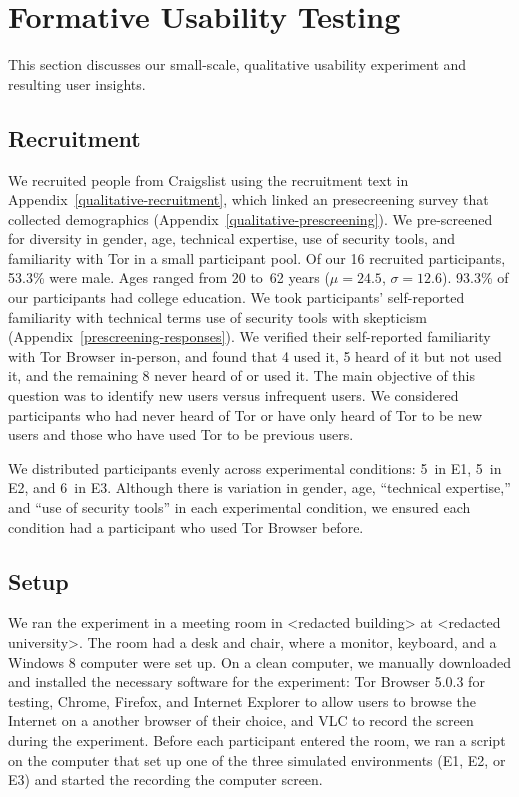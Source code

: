 \documentclass[USenglish,oneside,twocolumn]{article}
\begin{document}
\section{Formative Usability Testing}
\label{sec:qualitative}
This section discusses our small-scale, qualitative usability experiment and resulting user insights. 

\subsection{Recruitment}
We recruited people from Craigslist using the recruitment text in Appendix~\ref{qualitative-recruitment}, which linked an presecreening survey that collected demographics (Appendix~\ref{qualitative-prescreening}). We pre-screened~\cite{screening} for diversity in gender, age, technical expertise, use of security tools, and familiarity with Tor in a small participant pool. {\color {red} Of our 16 recruited participants, 53.3\% were male. Ages ranged from 20 to~62 years ($\mu = 24.5$, $\sigma = 12.6$). 93.3\% of our participants had college education.} We took participants' self-reported familiarity with technical terms use of security tools with skepticism (Appendix~\ref{prescreening-responses}). We verified their self-reported familiarity with Tor Browser in-person, and found that 4 used it, 5 heard of it but not used it, and the remaining 8 never heard of or used it. The main objective of this question was to identify new users versus infrequent users. We considered participants who had never heard of Tor or have only heard of Tor to be new users and those who have used Tor to be previous users. 

We distributed participants evenly across experimental conditions:  5~in E1, 5~in E2, and 6~in E3. Although there is variation in gender, age, ``technical expertise,'' and ``use of security tools'' in each experimental condition, we ensured each condition had a participant who used Tor Browser before. 

\subsection{Setup} 
We ran the experiment in a meeting room in <redacted building> at <redacted university>. The room had a desk and chair, where a monitor, keyboard, and a Windows 8 computer were set up. On a clean computer, we manually downloaded and installed the necessary software for the experiment: Tor Browser 5.0.3 for testing, Chrome, Firefox, and Internet Explorer to allow users to browse the Internet on a another browser of their choice, and VLC to record the screen during the experiment. Before each participant entered the room, we ran a script on the computer that
set up one of the three simulated environments (E1, E2, or E3) and started the recording the computer screen.  
\end{document}
